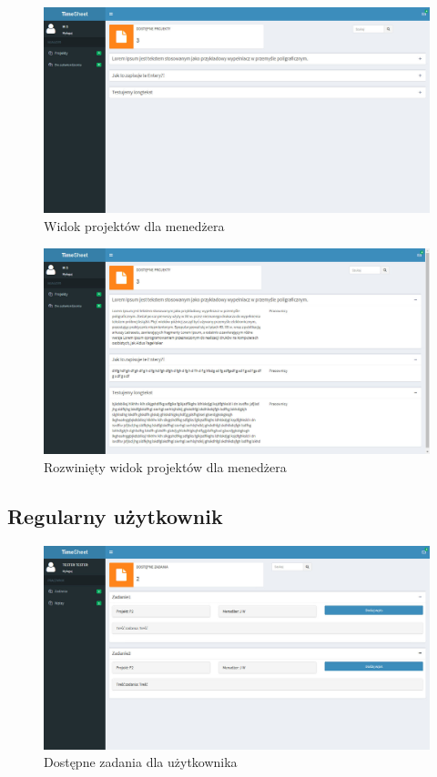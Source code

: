 \documentclass[a4paper, 12pt, oneside]{article}
\begin{document}
		\begin{figure}[H]
			\includegraphics[width=16cm]{managerprojekty.jpg}
			\caption{Widok projektów dla menedżera}
		\end{figure}
		
		\begin{figure}[H]
			\includegraphics[width=16cm]{managerprojektyrozwiniete.jpg}
			\caption{Rozwinięty widok projektów dla menedżera}
		\end{figure}
				
		
		
		\subsection{Regularny użytkownik}
		
		\begin{figure}[H]
			\includegraphics[width=16cm]{userzadania.jpg}
			\caption{Dostępne zadania dla użytkownika}
		\end{figure}
		
\end{document}
